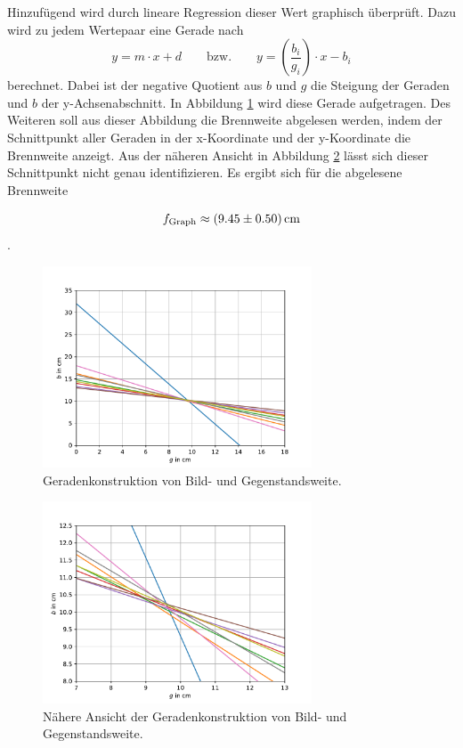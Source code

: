 Hinzufügend wird durch lineare Regression dieser Wert graphisch überprüft.
Dazu wird zu jedem Wertepaar eine Gerade nach
\begin{equation}
    y = m \cdot x + d \qquad \text{bzw.} \qquad  y = \left (\frac{b_i}{g_i}\right) \cdot x - b_i
\end{equation}
berechnet.
Dabei ist der negative Quotient aus $b$ und $g$ die Steigung der Geraden und $b$ der y-Achsenabschnitt.
In Abbildung \ref{fig:uno1} wird diese Gerade aufgetragen.
Des Weiteren soll aus dieser Abbildung die Brennweite abgelesen werden, indem der Schnittpunkt aller Geraden in der x-Koordinate und der y-Koordinate die Brennweite anzeigt.
Aus der näheren Ansicht in Abbildung \ref{fig:uno2} lässt sich dieser Schnittpunkt nicht genau identifizieren.
Es ergibt sich für die abgelesene Brennweite

\begin{equation}
    f_\text{Graph} \approx \SI{9.45 \pm 0.5}{cm}     \notag
\end{equation}.

\begin{figure}[h]
    \centering
    \includegraphics[height=6cm]{Auswertung/Uno1.pdf}
    \caption{Geradenkonstruktion von Bild- und Gegenstandsweite.}
    \label{fig:uno1}
\end{figure}

\begin{figure}[h]
    \centering
    \includegraphics[height=6cm]{Auswertung/Uno2.pdf}
    \caption{Nähere Ansicht der Geradenkonstruktion von Bild- und Gegenstandsweite.}
    \label{fig:uno2}
\end{figure}

